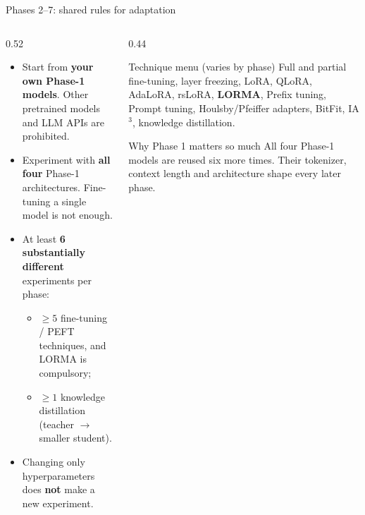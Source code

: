 \documentclass[aspectratio=169,11pt]{beamer}
\begin{document}
\begin{frame}{Phases 2--7: shared rules for adaptation}
  \begin{columns}[T]
    \begin{column}{0.52\textwidth}
      \begin{itemize}
        \item Start from \textbf{your own Phase-1 models}. Other pretrained models and LLM APIs are prohibited.
        \item Experiment with \textbf{all four} Phase-1 architectures. Fine-tuning a single model is not enough.
        \item At least \textbf{6 substantially different} experiments per phase:
          \begin{itemize}
            \item $\ge 5$ fine-tuning / PEFT techniques, and \alert{LORMA is compulsory};
            \item $\ge 1$ \alert{knowledge distillation} (teacher $\to$ smaller student).
          \end{itemize}
        \item Changing only hyperparameters does \textbf{not} make a new experiment.
      \end{itemize}
    \end{column}
    \begin{column}{0.44\textwidth}
      \begin{block}{Technique menu (varies by phase)}
        \small
        Full and partial fine-tuning, layer freezing, LoRA, QLoRA, AdaLoRA, rsLoRA,
        \textbf{LORMA}, Prefix tuning, Prompt tuning, Houlsby/Pfeiffer adapters,
        BitFit, IA$^3$, knowledge distillation.
      \end{block}
      \begin{exampleblock}{Why Phase 1 matters so much}
        \small
        All four Phase-1 models are reused six more times.
        Their tokenizer, context length and architecture shape every later phase.
      \end{exampleblock}
    \end{column}
  \end{columns}
\end{frame}
\end{document}
